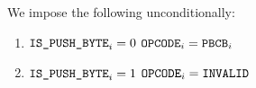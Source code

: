 We impose the following unconditionally:
\begin{enumerate}
        \item \If $\texttt{IS\_PUSH\_BYTE}_{i} = 0$ \Then $\texttt{OPCODE}_{i} = \texttt{PBCB}_{i}$
        \item \If $\texttt{IS\_PUSH\_BYTE}_{i} = 1$ \Then $\texttt{OPCODE}_{i} = \texttt{INVALID}$
\end{enumerate}
